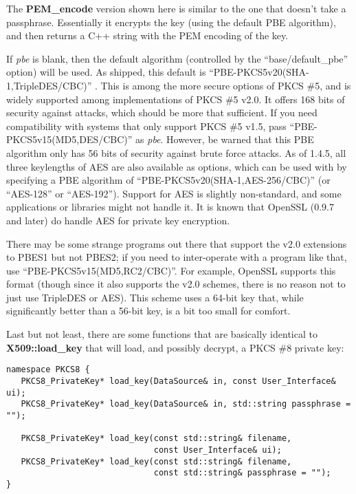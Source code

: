 \documentclass{article}
\newcommand{\function}[1]{\textbf{#1}}
\renewcommand{\arg}[1]{\textsl{#1}}
\begin{document}
The \function{PEM\_encode} version shown here is similar to the one that
doesn't take a passphrase. Essentially it encrypts the key (using the default
PBE algorithm), and then returns a C++ string with the PEM encoding of the key.

If \arg{pbe} is blank, then the default algorithm (controlled by the
``base/default\_pbe'' option) will be used. As shipped, this default is
``PBE-PKCS5v20(SHA-1,TripleDES/CBC)'' . This is among the more secure options
of PKCS \#5, and is widely supported among implementations of PKCS \#5 v2.0. It
offers 168 bits of security against attacks, which should be more that
sufficient. If you need compatibility with systems that only support PKCS \#5
v1.5, pass ``PBE-PKCS5v15(MD5,DES/CBC)'' as \arg{pbe}. However, be warned that
this PBE algorithm only has 56 bits of security against brute force attacks. As
of 1.4.5, all three keylengths of AES are also available as options, which can
be used with by specifying a PBE algorithm of
``PBE-PKCS5v20(SHA-1,AES-256/CBC)'' (or ``AES-128'' or ``AES-192''). Support
for AES is slightly non-standard, and some applications or libraries might not
handle it. It is known that OpenSSL (0.9.7 and later) do handle AES for private
key encryption.

There may be some strange programs out there that support the v2.0 extensions
to PBES1 but not PBES2; if you need to inter-operate with a program like that,
use ``PBE-PKCS5v15(MD5,RC2/CBC)''. For example, OpenSSL supports this format
(though since it also supports the v2.0 schemes, there is no reason not to just
use TripleDES or AES). This scheme uses a 64-bit key that, while
significantly better than a 56-bit key, is a bit too small for comfort.

Last but not least, there are some functions that are basically identical to
\function{X509::load\_key} that will load, and possibly decrypt, a PKCS \#8
private key:

\begin{verbatim}
namespace PKCS8 {
   PKCS8_PrivateKey* load_key(DataSource& in, const User_Interface& ui);
   PKCS8_PrivateKey* load_key(DataSource& in, std::string passphrase = "");

   PKCS8_PrivateKey* load_key(const std::string& filename,
                              const User_Interface& ui);
   PKCS8_PrivateKey* load_key(const std::string& filename,
                              const std::string& passphrase = "");
}
\end{verbatim}
\end{document}
